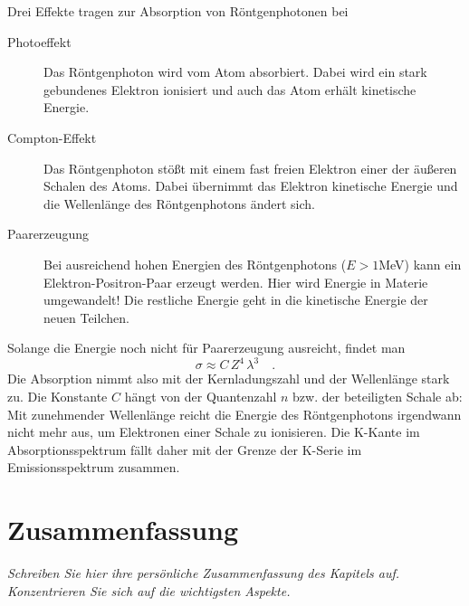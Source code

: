 Drei Effekte tragen zur Absorption von Röntgenphotonen bei
\begin{description}
    \item[Photoeffekt] Das Röntgenphoton wird vom Atom absorbiert. Dabei wird ein stark gebundenes Elektron ionisiert und auch das Atom erhält  kinetische Energie.
    \item[Compton-Effekt] Das Röntgenphoton stößt mit einem fast freien Elektron einer der äußeren Schalen des Atoms. Dabei übernimmt das Elektron kinetische Energie und die Wellenlänge des Röntgenphotons ändert sich.
    \item[Paarerzeugung] Bei ausreichend hohen Energien des Röntgenphotons ($E > 1$MeV) kann ein Elektron-Positron-Paar erzeugt werden. Hier wird Energie in Materie umgewandelt! Die restliche Energie geht in die kinetische Energie der neuen Teilchen.
\end{description}

Solange die Energie noch nicht für Paarerzeugung ausreicht, findet man
\begin{equation}
    \sigma \approx C \, Z^4 \, \lambda^3 \quad .
\end{equation}
Die Absorption nimmt also mit der Kernladungszahl und der Wellenlänge stark zu. Die Konstante $C$ hängt von der Quantenzahl $n$ bzw. der beteiligten Schale ab: Mit zunehmender Wellenlänge reicht die Energie des Röntgenphotons irgendwann nicht mehr aus, um Elektronen einer Schale zu ionisieren. Die K-Kante im Absorptionsspektrum fällt daher mit der Grenze der K-Serie im Emissionsspektrum zusammen.


\newpage

\section{Zusammenfassung}

\textit{Schreiben Sie hier ihre persönliche Zusammenfassung des Kapitels auf. Konzentrieren Sie sich auf die wichtigsten Aspekte.}

\vspace*{10cm}


\printbibliography[segment=\therefsegment,heading=subbibliography]
